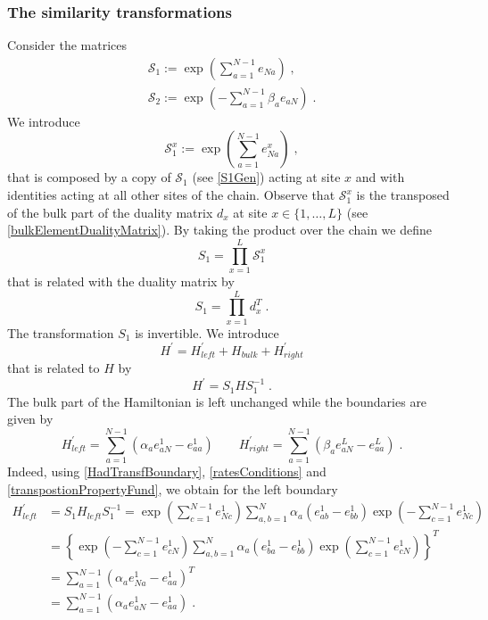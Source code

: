 \documentclass[10pt]{article}
\numberwithin{equation}{section}
\numberwithin{equation}{subsection}
\newcommand{\co}{\;,}
\newcommand{\dt}{\;.}
\begin{document}
\subsubsection{The similarity transformations}\label{subsectionSTransf}
Consider the matrices
\begin{align}
	\mathcal{S}_{1}:=\exp{\left(\sum_{a=1}^{N-1}e_{Na}\right)}\label{S1Gen}\co\\
	\mathcal{S}_{2}:=\exp{\left(-\sum_{a=1}^{N-1}\beta_{a}e_{aN}\right)}\dt\label{S2Gen}
\end{align}
We introduce
\begin{equation}\label{transformationV}
 \mathcal{S}_{1}^{x}:=\exp{\left(\sum_{a=1}^{N-1}e_{Na}^{x}\right)}\co %
\end{equation}
that is composed by a copy of $\mathcal{S}_{1}$ (see \eqref{S1Gen}) acting at site $x$ and with identities acting at all other sites of the chain. 
Observe that $\mathcal{S}_{1}^{x}$ is the transposed of the bulk part of the duality matrix $d_{x}$  at site $x\in \{1,\ldots,L\}$ (see \eqref{bulkElementDualityMatrix}). By taking the product over the chain we define
\begin{equation}\label{S1-Whole}
    S_{1}=\prod_{x=1}^{L}\mathcal{S}_{1}^{x}
\end{equation}
that is related with the duality matrix by 
\begin{equation}
S_{1}=\prod_{x=1}^{L}d_{x}^{T}\dt
\end{equation}
 The transformation $S_{1}$ is invertible. We introduce 
\begin{equation}\label{hatHamiltonian}
   H^{'}=H^{'}_{left}+H_{bulk}+H^{'}_{right}
\end{equation}
that is related to $H$ by
\begin{equation}\label{similarV}
   H^{'}=S_{1}HS_{1}^{-1}\dt
\end{equation}
The bulk part of the Hamiltonian is left unchanged while the boundaries are given by 
\begin{equation}
	H^{'}_{left}=\sum_{a=1}^{N-1}\left(\alpha_{a}e_{aN}^{1}-e_{aa}^{1}\right)\qquad H^{'}_{right}=\sum_{a=1}^{N-1}\left(\beta_{a}e_{aN}^{L}-e_{aa}^{L}\right)\dt
\end{equation}
Indeed, using \eqref{HadTransfBoundary}, \eqref{ratesConditions} and \eqref{transpostionPropertyFund}, we obtain for the left boundary
\begin{equation}
	\begin{split}
		H_{left}^{'}&=S_{1}H_{left}S_{1}^{-1}=\exp{\left(\sum_{c=1}^{N-1}e_{Nc}^{1}\right)}\sum_{a,b=1}^{N}\alpha_{a}\left(e_{ab}^{1}-e_{bb}^{1}\right)\exp{\left(-\sum_{c=1}^{N-1}e_{Nc}^{1}\right)}
		\\&=
		\left\{\exp{\left(-\sum_{c=1}^{N-1}e_{cN}^{1}\right)}\sum_{a,b=1}^{N}\alpha_{a}\left(e_{ba}^{1}-e_{bb}^{1}\right)\exp{\left(\sum_{c=1}^{N-1}e_{cN}^{1}\right)}\right\}^{T}
		\\&=
		\sum_{a=1}^{N-1}\left(\alpha_{a}e_{Na}^{1}-e_{aa}^{1}\right)^{T}
		\\&=
		\sum_{a=1}^{N-1}\left(\alpha_{a}e_{aN}^{1}-e_{aa}^{1}\right)\dt
	\end{split}
\end{equation}
\end{document}
